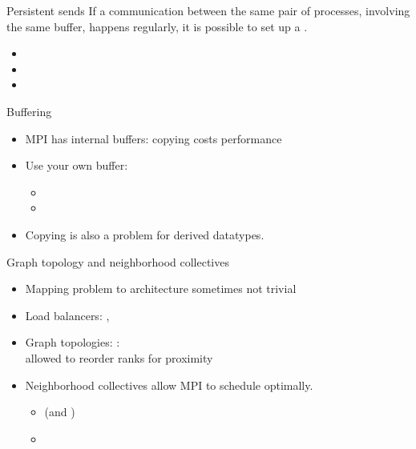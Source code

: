 \begin{frame}[containsverbatim]{Persistent sends}
  If a communication between the same pair of processes, involving the
  same buffer, happens regularly, it is possible to set up a
  .

  \begin{itemize}
  \item {}
  \item {}
  \item {}
  \end{itemize}

\end{frame}

\begin{frame}[containsverbatim]{Buffering}

  \begin{itemize}
  \item MPI has internal buffers: copying costs performance
  \item Use your own buffer:
    \begin{itemize}
    \item {}
    \item {}
    \end{itemize}
  \item Copying is also a problem for derived datatypes.
  \end{itemize}
\end{frame}

\begin{frame}[containsverbatim]{Graph topology and neighborhood collectives}
  \begin{itemize}
  \item Mapping problem to architecture sometimes not trivial
  \item Load balancers: , 
  \item Graph topologies: :\\
    allowed to reorder ranks for proximity
  \item Neighborhood collectives allow MPI to schedule optimally.
    \begin{itemize}
    \item {} (and )
    \item {}
    \end{itemize}
  \end{itemize}
\end{frame}

